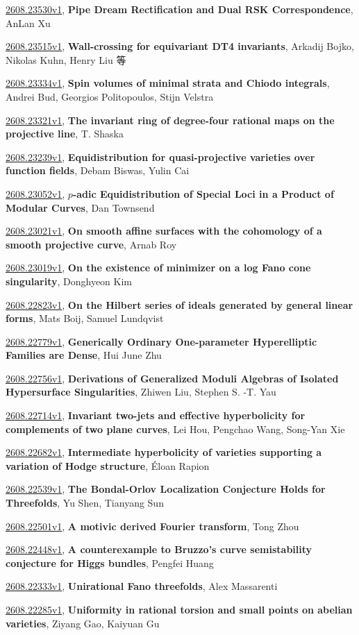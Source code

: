 \documentclass[9pt, a4paper]{article}
\theoremstyle{plain}
\theoremstyle{definition}
\theoremstyle{remark}
\newcommand{\arxiv}[3]{\href{https://arxiv.org/abs/#1}{#1}, \textbf{\textcolor{arxivblue}{#2}}, #3}
\begin{document}
\arxiv{2608.23530v1}{Pipe Dream Rectification and Dual RSK Correspondence}{AnLan Xu}

\arxiv{2608.23515v1}{Wall-crossing for equivariant DT4 invariants}{Arkadij Bojko, Nikolas Kuhn, Henry Liu 等}

\arxiv{2608.23334v1}{Spin volumes of minimal strata and Chiodo integrals}{Andrei Bud, Georgios Politopoulos, Stijn Velstra}

\arxiv{2608.23321v1}{The invariant ring of degree-four rational maps on the projective line}{T. Shaska}

\arxiv{2608.23239v1}{Equidistribution for quasi-projective varieties over function fields}{Debam Biswas, Yulin Cai}

\arxiv{2608.23052v1}{$p$-adic Equidistribution of Special Loci in a Product of Modular Curves}{Dan Townsend}

\arxiv{2608.23021v1}{On smooth affine surfaces with the cohomology of a smooth projective curve}{Arnab Roy}

\arxiv{2608.23019v1}{On the existence of minimizer on a log Fano cone singularity}{Donghyeon Kim}

\arxiv{2608.22823v1}{On the Hilbert series of ideals generated by general linear forms}{Mats Boij, Samuel Lundqvist}

\arxiv{2608.22779v1}{Generically Ordinary One-parameter Hyperelliptic Families are Dense}{Hui June Zhu}

\arxiv{2608.22756v1}{Derivations of Generalized Moduli Algebras of Isolated Hypersurface Singularities}{Zhiwen Liu, Stephen S. -T. Yau}

\arxiv{2608.22714v1}{Invariant two-jets and effective hyperbolicity for complements of two plane curves}{Lei Hou, Pengchao Wang, Song-Yan Xie}

\arxiv{2608.22682v1}{Intermediate hyperbolicity of varieties supporting a variation of Hodge structure}{Éloan Rapion}

\arxiv{2608.22539v1}{The Bondal-Orlov Localization Conjecture Holds for Threefolds}{Yu Shen, Tianyang Sun}

\arxiv{2608.22501v1}{A motivic derived Fourier transform}{Tong Zhou}

\arxiv{2608.22448v1}{A counterexample to Bruzzo's curve semistability conjecture for Higgs bundles}{Pengfei Huang}

\arxiv{2608.22333v1}{Unirational Fano threefolds}{Alex Massarenti}

\arxiv{2608.22285v1}{Uniformity in rational torsion and small points on abelian varieties}{Ziyang Gao, Kaiyuan Gu}
\end{document}
